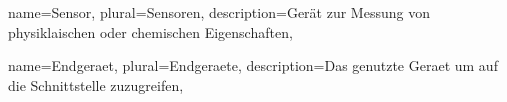 \makenoidxglossaries
{}
{
	name=Sensor,
	plural=Sensoren,
	description={Gerät zur Messung von physiklaischen oder chemischen Eigenschaften},
}

 {
	name=Endgeraet,
	plural=Endgeraete,
    description={Das genutzte Geraet um auf die Schnittstelle zuzugreifen},
}

